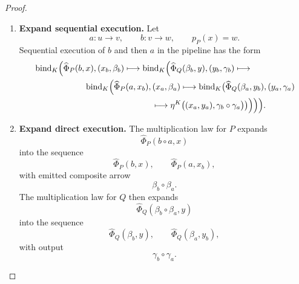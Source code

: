 \begin{proof}
\begin{enumerate}
        \item \textbf{Expand sequential execution.}
        Let
        \[
            a:u\to v,
            \qquad
            b:v\to w,
            \qquad
            p_P(x)=w.
        \]
        Sequential execution of \(b\) and then \(a\) in the pipeline has the
        form
        \[
        \begin{aligned}
            &
            \operatorname{bind}_{K}
            \Bigl(
                \widehat\Phi_P(b,x),
                (x_b,\beta_b)
                \longmapsto
                \operatorname{bind}_{K}
                \Bigl(
                    \widehat\Phi_Q(\beta_b,y),
                    (y_b,\gamma_b)
                    \longmapsto
            \\
            &\hspace{6em}
                    \operatorname{bind}_{K}
                    \Bigl(
                        \widehat\Phi_P(a,x_b),
                        (x_a,\beta_a)
                        \longmapsto
                        \operatorname{bind}_{K}
                        \bigl(
                            \widehat\Phi_Q(\beta_a,y_b),
                            (y_a,\gamma_a)
            \\
            &\hspace{14em}
                            \longmapsto
                            \eta^K
                            \bigl(
                                (x_a,y_a),
                                \gamma_b\circ\gamma_a
                            \bigr)
                        \bigr)
                    \Bigr)
                \Bigr)
            \Bigr).
        \end{aligned}
        \label{eq:effectful-pipeline-sequential-expanded}
        \]

        \item \textbf{Expand direct execution.}
        The multiplication law for \(P\) expands
        \[
            \widehat\Phi_P(b\circ a,x)
        \]
        into the sequence
        \[
            \widehat\Phi_P(b,x),
            \qquad
            \widehat\Phi_P(a,x_b),
        \]
        with emitted composite arrow
        \[
            \beta_b\circ\beta_a.
        \]
        The multiplication law for \(Q\) then expands
        \[
            \widehat\Phi_Q(\beta_b\circ\beta_a,y)
        \]
        into the sequence
        \[
            \widehat\Phi_Q(\beta_b,y),
            \qquad
            \widehat\Phi_Q(\beta_a,y_b),
        \]
        with output
        \[
            \gamma_b\circ\gamma_a.
        \]


\end{enumerate}
\end{proof}
